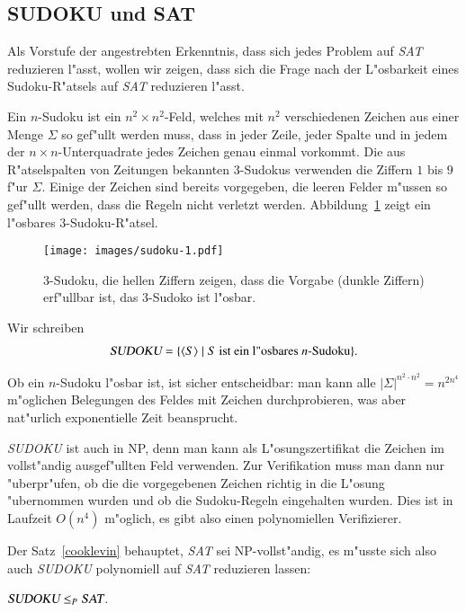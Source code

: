 \subsection{SUDOKU und SAT}
Als Vorstufe der angestrebten Erkenntnis, dass sich jedes Problem auf \textsl{SAT}
reduzieren l"asst, wollen wir zeigen, dass sich die Frage nach der
L"osbarkeit eines Sudoku-R"atsels auf \textsl{SAT} reduzieren l"asst.

Ein $n$-Sudoku ist ein $n^2\times n^2$-Feld, welches mit $n^2$ verschiedenen
Zeichen aus einer Menge $\Sigma$ so gef"ullt werden muss,
dass in jeder Zeile, jeder Spalte
und in jedem der $n\times n$-Unterquadrate jedes Zeichen genau einmal
vorkommt.
Die aus R"atselspalten von Zeitungen bekannten $3$-Sudokus verwenden
die Ziffern $1$ bis $9$ f"ur $\Sigma$.
Einige der Zeichen sind bereits vorgegeben, die leeren Felder m"ussen
so gef"ullt werden, dass die Regeln nicht verletzt werden.
Abbildung~\ref{sudoku} zeigt ein l"osbares $3$-Sudoku-R"atsel.
\begin{figure}
\begin{center}
\texttt{[image: images/sudoku-1.pdf]}
\end{center}
\caption{$3$-Sudoku, die hellen Ziffern zeigen, dass die Vorgabe (dunkle
Ziffern) erf"ullbar ist, das $3$-Sudoko ist l"osbar.\label{sudoku}}
\end{figure}
Wir schreiben
\begin{align*}
\textsl{SUDOKU}
=
\{\langle S\rangle\;|\; \text{$S$ ist ein l"osbares $n$-Sudoku}\}.
\end{align*}

Ob ein $n$-Sudoku l"osbar ist, ist sicher entscheidbar: man kann alle
$|\Sigma|^{n^2\cdot n^2}=n^{2n^4}$ m"oglichen Belegungen des Feldes mit
Zeichen durchprobieren, was aber nat"urlich exponentielle Zeit
beansprucht.

\textsl{SUDOKU} ist auch in NP, denn man kann als L"osungszertifikat
die Zeichen im vollst"andig ausgef"ullten Feld verwenden.
Zur Verifikation muss man dann nur "uberpr"ufen, ob die
die vorgegebenen Zeichen richtig in die L"osung "ubernommen wurden und
ob die Sudoku-Regeln eingehalten wurden. Dies ist in Laufzeit $O(n^4)$
m"oglich, es gibt also einen polynomiellen Verifizierer.

Der Satz~\ref{cooklevin} behauptet, \textsl{SAT} sei NP-vollst"andig,
es m"usste sich also auch \textsl{SUDOKU} polynomiell auf \textsl{SAT}
reduzieren lassen:

\begin{satz} $\textsl{SUDOKU}\le_P\textsl{SAT}$.
\end{satz}

